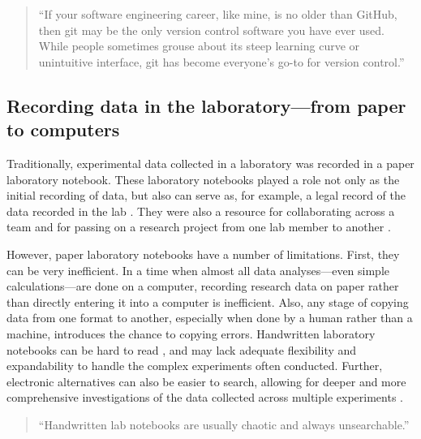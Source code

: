 \documentclass[]{tufte-book}
\begin{document}
\begin{quote}
``If your software engineering career, like mine, is no older than GitHub, then
git may be the only version control software you have ever used. While people
sometimes grouse about its steep learning curve or unintuitive interface, git has
become everyone's go-to for version control.'' \citep{target2018version}
\end{quote}

\hypertarget{recording-data-in-the-laboratoryfrom-paper-to-computers}{%
\subsection{Recording data in the laboratory---from paper to computers}\label{recording-data-in-the-laboratoryfrom-paper-to-computers}}

Traditionally, experimental data collected in a laboratory was recorded in a
paper laboratory notebook. These laboratory notebooks played a role not only as
the initial recording of data, but also can serve as, for example, a legal
record of the data recorded in the lab \citep{mascarelli2014research}. They were also
a resource for collaborating across a team and for passing on a research project
from one lab member to another \citep{butler2005electronic}.

However, paper laboratory notebooks have a number of limitations. First, they
can be very inefficient. In a time when almost all data analyses---even simple
calculations---are done on a computer, recording research data on paper rather
than directly entering it into a computer is inefficient. Also, any stage of
copying data from one format to another, especially when done by a human rather
than a machine, introduces the chance to copying errors. Handwritten laboratory
notebooks can be hard to read \citep{butler2005electronic, perkel2011coding}, and
may lack adequate flexibility and expandability to handle the complex
experiments often conducted. Further, electronic alternatives can also be easier
to search, allowing for deeper and more comprehensive investigations of the data
collected across multiple experiments \citep{giles2012digital, butler2005electronic, perkel2011coding}.

\begin{quote}
``Handwritten lab notebooks are usually chaotic and always unsearchable.''
\citep{perkel2011coding}
\end{quote}
\end{document}

